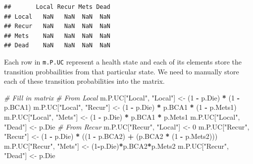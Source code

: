 \documentclass[]{article}
\newenvironment{Shaded}{\begin{snugshade}}{\end{snugshade}}
\newcommand{\DecValTok}[1]{\textcolor[rgb]{0.00,0.00,0.81}{#1}}
\newcommand{\StringTok}[1]{\textcolor[rgb]{0.31,0.60,0.02}{#1}}
\newcommand{\CommentTok}[1]{\textcolor[rgb]{0.56,0.35,0.01}{\textit{#1}}}
\newcommand{\OperatorTok}[1]{\textcolor[rgb]{0.81,0.36,0.00}{\textbf{#1}}}
\newcommand{\NormalTok}[1]{#1}
\theoremstyle{definition}
\theoremstyle{definition}
\theoremstyle{definition}
\theoremstyle{remark}
\begin{document}
\begin{verbatim}
##       Local Recur Mets Dead
## Local   NaN   NaN  NaN  NaN
## Recur   NaN   NaN  NaN  NaN
## Mets    NaN   NaN  NaN  NaN
## Dead    NaN   NaN  NaN  NaN
\end{verbatim}

Each row in \texttt{m.P.UC} represent a health state and each of its
elements store the transition probbailities from that particular state.
We need to manually store each of these transition probabilities into
the matrix.

\begin{Shaded}
\begin{Highlighting}[]
\CommentTok{# Fill in matrix}
\CommentTok{# From Local}
\NormalTok{m.P.UC[}\StringTok{"Local"}\NormalTok{, }\StringTok{"Local"}\NormalTok{] <-}\StringTok{ }\NormalTok{(}\DecValTok{1} \OperatorTok{-}\StringTok{ }\NormalTok{p.Die) }\OperatorTok{*}\StringTok{ }\NormalTok{(}\DecValTok{1} \OperatorTok{-}\StringTok{ }\NormalTok{p.BCA1)}
\NormalTok{m.P.UC[}\StringTok{"Local"}\NormalTok{, }\StringTok{"Recur"}\NormalTok{] <-}\StringTok{ }\NormalTok{(}\DecValTok{1} \OperatorTok{-}\StringTok{ }\NormalTok{p.Die) }\OperatorTok{*}\StringTok{ }\NormalTok{p.BCA1 }\OperatorTok{*}\StringTok{ }\NormalTok{(}\DecValTok{1} \OperatorTok{-}\StringTok{ }\NormalTok{p.Mets1) }
\NormalTok{m.P.UC[}\StringTok{"Local"}\NormalTok{, }\StringTok{"Mets"}\NormalTok{]  <-}\StringTok{ }\NormalTok{(}\DecValTok{1} \OperatorTok{-}\StringTok{ }\NormalTok{p.Die) }\OperatorTok{*}\StringTok{ }\NormalTok{p.BCA1 }\OperatorTok{*}\StringTok{ }\NormalTok{p.Mets1}
\NormalTok{m.P.UC[}\StringTok{"Local"}\NormalTok{, }\StringTok{"Dead"}\NormalTok{]  <-}\StringTok{ }\NormalTok{p.Die}
\CommentTok{# From Recur}
\NormalTok{m.P.UC[}\StringTok{"Recur"}\NormalTok{, }\StringTok{"Local"}\NormalTok{] <-}\StringTok{ }\DecValTok{0}
\NormalTok{m.P.UC[}\StringTok{"Recur"}\NormalTok{, }\StringTok{"Recur"}\NormalTok{] <-}\StringTok{ }\NormalTok{(}\DecValTok{1} \OperatorTok{-}\StringTok{ }\NormalTok{p.Die) }\OperatorTok{*}\StringTok{ }\NormalTok{((}\DecValTok{1} \OperatorTok{-}\StringTok{ }\NormalTok{p.BCA2) }\OperatorTok{+}\StringTok{ }\NormalTok{(p.BCA2 }\OperatorTok{*}\StringTok{ }\NormalTok{(}\DecValTok{1} \OperatorTok{-}\StringTok{ }\NormalTok{p.Mets2)))}
\NormalTok{m.P.UC[}\StringTok{"Recur"}\NormalTok{, }\StringTok{"Mets"}\NormalTok{]  <-}\StringTok{ }\NormalTok{(}\DecValTok{1}\OperatorTok{-}\NormalTok{p.Die)}\OperatorTok{*}\NormalTok{p.BCA2}\OperatorTok{*}\NormalTok{p.Mets2}
\NormalTok{m.P.UC[}\StringTok{"Recur"}\NormalTok{, }\StringTok{"Dead"}\NormalTok{]  <-}\StringTok{ }\NormalTok{p.Die}

\end{Highlighting}
\end{Shaded}
\end{document}
